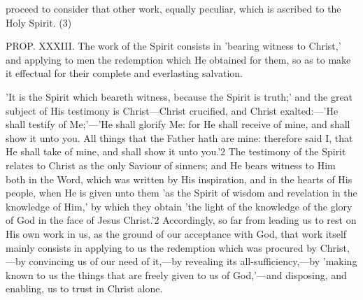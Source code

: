 \documentclass[
]{book}
\begin{document}
proceed to consider that other work, equally peculiar, which is ascribed to the Holy Spirit. (3)

PROP. XXXIII. The work of the Spirit consists in 'bearing witness to Christ,' and applying to men the redemption which He obtained for them, so as to make it effectual for their complete and everlasting salvation.

'It is the Spirit which beareth witness, because the Spirit is truth;' and the great subject of His testimony is Christ---Christ crucified, and Christ exalted:---'He shall testify of Me;'---'He shall glorify Me: for He shall receive of mine, and shall show it unto you. All things that the Father hath are mine: therefore said I, that He shall take of mine, and shall show it unto you.'2 The testimony of the Spirit relates to Christ as the only Saviour of sinners; and He bears witness to Him both in the Word, which was written by His inspiration, and in the hearts of His people, when He is given unto them 'as the Spirit of wisdom and revelation in the knowledge of Him,' by which they obtain 'the light of the knowledge of the glory of God in the face of Jesus Christ.'2 Accordingly, so far from leading us to rest on His own work in us, as the ground of our acceptance with God, that work itself mainly consists in applying to us the redemption which was procured by Christ,---by convincing us of our need of it,---by revealing its all-sufficiency,---by 'making known to us the things that are freely given to us of God,'---and disposing, and enabling, us to trust in Christ alone.
\end{document}
